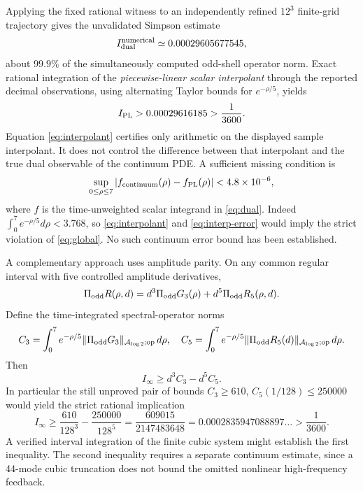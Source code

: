 \documentclass[11pt,a4paper]{article}
\theoremstyle{remark}
\newcommand{\A}{\mathcal A_{\log 2}}
\newcommand{\op}{\mathrm{op}}
\begin{document}
Applying the fixed rational witness to an independently refined $12^3$ finite-grid trajectory gives the unvalidated Simpson estimate
\begin{equation}\label{eq:dual-num}
I_{\rm dual}^{\rm numerical}\simeq0.00029605677545,
\end{equation}
about $99.9\%$ of the simultaneously computed odd-shell operator norm. Exact rational integration of the \emph{piecewise-linear scalar interpolant} through the reported decimal observations, using alternating Taylor bounds for $e^{-\rho/5}$, yields
\begin{equation}\label{eq:interpolant}
I_{\rm PL}>0.00029616185>\frac1{3600}.
\end{equation}
Equation \eqref{eq:interpolant} certifies only arithmetic on the displayed sample interpolant. It does not control the difference between that interpolant and the true dual observable of the continuum PDE. A sufficient missing condition is
\begin{equation}\label{eq:interp-error}
\sup_{0\leq\rho\leq7}
\left|f_{\rm continuum}(\rho)-f_{\rm PL}(\rho)\right|
<4.8\times10^{-6},
\end{equation}
where $f$ is the time-unweighted scalar integrand in \eqref{eq:dual}. Indeed $\int_0^7e^{-\rho/5}d\rho<3.768$, so \eqref{eq:interpolant} and \eqref{eq:interp-error} would imply the strict violation of \eqref{eq:global}. No such continuum error bound has been established.

A complementary approach uses amplitude parity. On any common regular interval with five controlled amplitude derivatives,
\begin{equation}\label{eq:remainder}
\Pi_{\rm odd}R(\rho,d)=d^3\Pi_{\rm odd}G_3(\rho)+d^5\Pi_{\rm odd}R_5(\rho,d).
\end{equation}
Define the time-integrated spectral-operator norms
\begin{equation}\label{eq:C35}
C_3=\int_0^7e^{-\rho/5}\|\Pi_{\rm odd}G_3\|_{\A;\op}\,d\rho,
\quad C_5=\int_0^7e^{-\rho/5}\|\Pi_{\rm odd}R_5(d)\|_{\A;\op}\,d\rho.
\end{equation}
Then
\begin{equation}\label{eq:reverse}
I_\infty\geq d^3C_3-d^5C_5.
\end{equation}
In particular the still unproved pair of bounds $C_3\geq610$, $C_5(1/128)\leq250000$ would yield the strict rational implication
\begin{equation}\label{eq:conditional}
I_\infty\geq\frac{610}{128^3}-\frac{250000}{128^5}
=\frac{609015}{2147483648}
=0.0002835947088897\ldots>\frac1{3600}.
\end{equation}
A verified interval integration of the finite cubic system might establish the first inequality. The second inequality requires a separate continuum estimate, since a 44-mode cubic truncation does not bound the omitted nonlinear high-frequency feedback.
\end{document}
